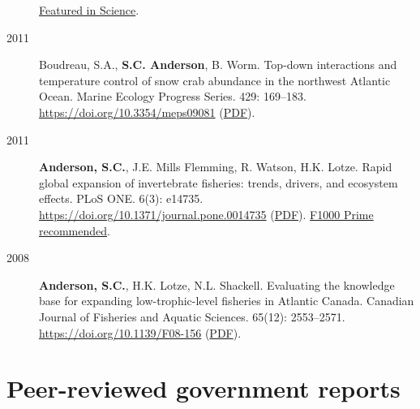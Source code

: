 \begin{description}
\href{http://www.sciencemag.org/content/331/6014/129.1.full}{Featured in
Science}.
\item[2011]
Boudreau, S.A., \textbf{S.C. Anderson}, B. Worm. Top-down interactions
and temperature control of snow crab abundance in the northwest Atlantic
Ocean. Marine Ecology Progress Series. 429: 169--183.
\url{https://doi.org/10.3354/meps09081}
(\href{http://www.int-res.com/articles/meps_oa/m429p169.pdf}{PDF}).
\item[2011]
\textbf{Anderson, S.C.}, J.E. Mills Flemming, R. Watson, H.K. Lotze.
Rapid global expansion of invertebrate fisheries: trends, drivers, and
ecosystem effects. PLoS ONE. 6(3): e14735.
\url{https://doi.org/10.1371/journal.pone.0014735}
(\href{http://www.plosone.org/article/fetchObject.action?uri=info\%3Adoi\%2F10.1371\%2Fjournal.pone.0014735&representation=PDF}{PDF}).
\href{https://f1000.com/prime/9542957}{F1000 Prime recommended}.
\item[2008]
\textbf{Anderson, S.C.}, H.K. Lotze, N.L. Shackell. Evaluating the
knowledge base for expanding low-trophic-level fisheries in Atlantic
Canada. Canadian Journal of Fisheries and Aquatic Sciences. 65(12):
2553--2571. \url{https://doi.org/10.1139/F08-156}
(\href{https://www.dropbox.com/s/b0la81jbqitib6u/Anderson_etal_2008_knowledge.pdf?dl=1}{PDF}).
\end{description}

\section{Peer-reviewed government
reports}\label{peer-reviewed-government-reports}

